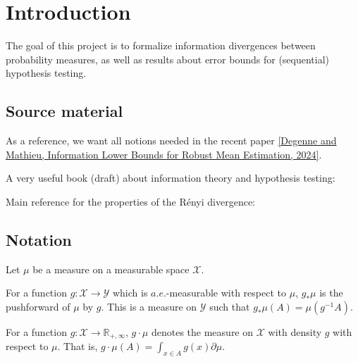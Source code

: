 \chapter*{Introduction}

The goal of this project is to formalize information divergences between probability measures, as well as results about error bounds for (sequential) hypothesis testing.

\section*{Source material}

As a reference, we want all notions needed in the recent paper \href{https://arxiv.org/abs/2403.01892}{[Degenne and Mathieu, Information Lower Bounds for Robust Mean Estimation, 2024]}.

A very useful book (draft) about information theory and hypothesis testing: \cite{polyanskiy2024information} 

Main reference for the properties of the Rényi divergence: \cite{van2014renyi}

\section*{Notation}

Let $\mu$ be a measure on a measurable space $\mathcal X$.

For a function $g : \mathcal X \to \mathcal Y$ which is $a.e.$-measurable with respect to $\mu$, $g_* \mu$ is the pushforward of $\mu$ by $g$. This is a measure on $\mathcal Y$ such that $g_* \mu (A) = \mu(g^{-1} A)$.

For a function $g : \mathcal X \to \mathbb{R}_{+,\infty}$, $g \cdot \mu$ denotes the measure on $\mathcal X$ with density $g$ with respect to $\mu$. That is, $g \cdot \mu (A) = \int_{x \in A} g(x) \partial\mu$.